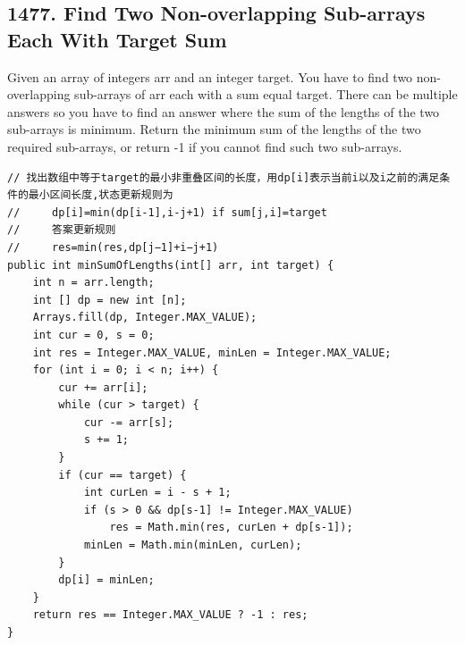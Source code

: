 \documentclass[9pt, b5paaper]{book}
\begin{document}
\subsection{1477. Find Two Non-overlapping Sub-arrays Each With Target Sum}
\label{sec-1-4-40}
Given an array of integers arr and an integer target.
You have to find two non-overlapping sub-arrays of arr each with a sum equal target. There can be multiple answers so you have to find an answer where the sum of the lengths of the two sub-arrays is minimum.
Return the minimum sum of the lengths of the two required sub-arrays, or return -1 if you cannot find such two sub-arrays.
\begin{verbatim}
// 找出数组中等于target的最小非重叠区间的长度，用dp[i]表示当前i以及i之前的满足条件的最小区间长度,状态更新规则为
//     dp[i]=min(dp[i-1],i-j+1) if sum[j,i]=target
//     答案更新规则
//     res=min(res,dp[j−1]+i−j+1)
public int minSumOfLengths(int[] arr, int target) {
    int n = arr.length;
    int [] dp = new int [n];
    Arrays.fill(dp, Integer.MAX_VALUE);
    int cur = 0, s = 0;
    int res = Integer.MAX_VALUE, minLen = Integer.MAX_VALUE;
    for (int i = 0; i < n; i++) {
        cur += arr[i];
        while (cur > target) {
            cur -= arr[s];
            s += 1;
        }
        if (cur == target) {
            int curLen = i - s + 1;
            if (s > 0 && dp[s-1] != Integer.MAX_VALUE) 
                res = Math.min(res, curLen + dp[s-1]);
            minLen = Math.min(minLen, curLen);
        }
        dp[i] = minLen;
    }
    return res == Integer.MAX_VALUE ? -1 : res;
}
\end{verbatim}
\end{document}
